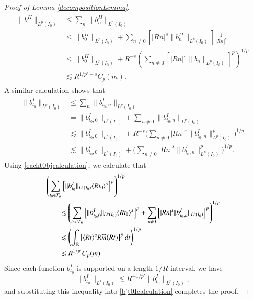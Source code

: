 \begin{proof} [Proof of Lemma \ref{decompositionLemma}]
    \begin{align}
    \begin{split}
        \|  b^{II} \|_{L^p(I_0)} &\leq \sum\nolimits_n \| b_{n}^{II} \|_{L^p(I_0)}\\
        &\leq \| b_{0}^{II} \|_{L^p(I_0)} + \sum\nolimits_{n \neq 0} \left[ |R n|^{s} \| b_{n}^{II} \|_{L^p(I_0)} \right] \frac{1}{|R n|^{s}}\\
        &\leq \| b_{0}^{II} \|_{L^p(I_0)} + R^{-s} \left( \sum\nolimits_{n \neq 0} \left[ |R n|^{s} \| b_{n} \|_{L^p(I_0)} \right]^p \right)^{1/p}\\ %
        &\lesssim R^{1/p' - s} C_p(m).
    \end{split}
    \end{align}
    A similar calculation shows that
    \begin{align} \label{eacht0bjcalculation}
    \begin{split}
        \| b_{t_0}^I \|_{L^p(I_0)} &\leq \sum\nolimits_n \| b_{t_0,n}^I \|_{L^p(I_0)}\\
        &= \| b_{t_0,0}^I \|_{L^p(I_0)} + \sum\nolimits_{n \neq 0} \| b_{t_0,n}^I \|_{L^p(I_0)}\\
        &\lesssim \| b_{t_0,0}^I \|_{L^p(I_0)} + R^{-s} \Big( \sum\nolimits_{n \neq 0} |R n|^{s} \| b_{t_0,n}^I \|_{L^p(I_0)}^p \Big)^{1/p}\\
        &\lesssim \| b_{t_0,0}^I \|_{L^p(I_0)} + \Big( \sum\nolimits_{n \neq 0} |R n|^{s} \| b_{t_0,n}^I \|_{L^p(I_0)}^p \Big)^{1/p}.
    \end{split}
    \end{align}
    Using \eqref{eacht0bjcalculation}, we calculate that
    \begin{align} \label{bjt0Icalculation}
    \begin{split}
        &\left( \sum_{t_0 \in \mathcal{T}_R} \left[ \| b_{t_0}^I \|_{L^p(I_0)} \langle R t_0 \rangle^{s} \right]^p \right)^{1/p}\\
        &\quad\quad \lesssim \left( \sum_{t_0 \in \mathcal{T}_R} \left[ \| b_{t_0,0}^I \|_{L^p(I_0)} \langle R t_0 \rangle^{s} \right]^p + \sum_{n \neq 0} \left[ |R n|^{s} \| b_{t_0,n}^I \|_{L^p(I_0)} \right]^p \right)^{1/p}\\
        &\quad\quad \lesssim \left( \int_{\operatorname{\mathbb{R}}} \left[ \langle R t \rangle^{s} R \widehat{m}(R t) \right]^p dt \right)^{1/p}\\
        &\quad\quad \lesssim R^{1/p'} C_p(m).
    \end{split}
    \end{align}
    Since each function $b_{t_0}^I$ is supported on a length $1/R$ interval, we have
    \begin{equation}
        \| b_{t_0}^I \|_{L^1(I_0)} \lesssim R^{-1/p'} \| b_{t_0}^I \|_{L^p(I_0)},
    \end{equation}
    and substituting this inequality into \eqref{bjt0Icalculation} completes the proof.
\end{proof}

